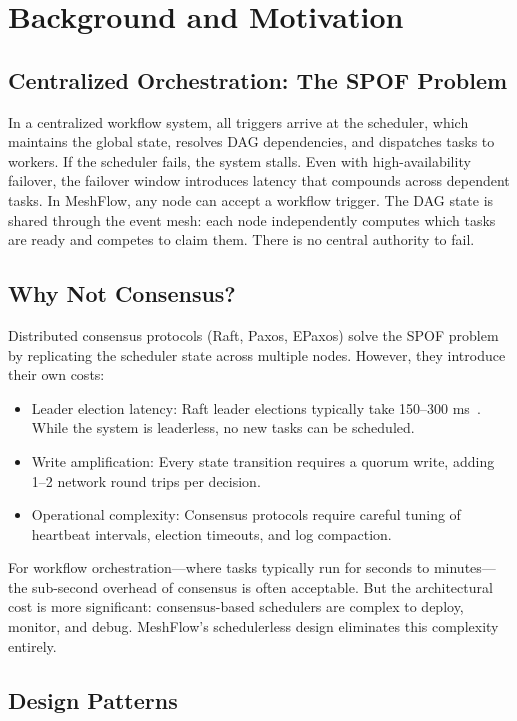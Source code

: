 \documentclass[sigconf]{acmart}
\begin{document}
\section{Background and Motivation}

\subsection{Centralized Orchestration: The SPOF Problem}

In a centralized workflow system, all triggers arrive at the scheduler, which maintains the global state, resolves DAG dependencies, and dispatches tasks to workers. If the scheduler fails, the system stalls. Even with high-availability failover, the failover window introduces latency that compounds across dependent tasks. In MeshFlow, any node can accept a workflow trigger. The DAG state is shared through the event mesh: each node independently computes which tasks are ready and competes to claim them. There is no central authority to fail.

\subsection{Why Not Consensus?}

Distributed consensus protocols (Raft, Paxos, EPaxos) solve the SPOF problem by replicating the scheduler state across multiple nodes. However, they introduce their own costs:

\begin{itemize}
\item Leader election latency: Raft leader elections typically take 150--300 ms~\cite{raft}. While the system is leaderless, no new tasks can be scheduled.
\item Write amplification: Every state transition requires a quorum write, adding 1--2 network round trips per decision.
\item Operational complexity: Consensus protocols require careful tuning of heartbeat intervals, election timeouts, and log compaction.
\end{itemize}

For workflow orchestration---where tasks typically run for seconds to minutes---the sub-second overhead of consensus is often acceptable. But the architectural cost is more significant: consensus-based schedulers are complex to deploy, monitor, and debug. MeshFlow's schedulerless design eliminates this complexity entirely.

\subsection{Design Patterns}
\end{document}
